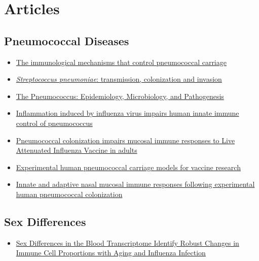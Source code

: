 \documentclass[
]{book}
\providecommand{\tightlist}{%
  \setlength{\itemsep}{0pt}\setlength{\parskip}{0pt}}
\begin{document}
\hypertarget{articles}{%
\section{Articles}\label{articles}}

\hypertarget{pneumococcal-diseases}{%
\subsection{Pneumococcal Diseases}\label{pneumococcal-diseases}}

\begin{itemize}
\item
  \href{https://journals.plos.org/plospathogens/article?id=10.1371/journal.ppat.1006665}{The immunological mechanisms that control pneumococcal carriage}
\item
  \href{https://pubmed.ncbi.nlm.nih.gov/29599457/}{\emph{Streptococcus pneumoniae}: transmission, colonization and invasion}
\item
  \href{https://pubmed.ncbi.nlm.nih.gov/23818515/}{The Pneumococcus: Epidemiology, Microbiology, and Pathogenesis}
\item
  \href{https://pubmed.ncbi.nlm.nih.gov/30374129/}{Inflammation induced by influenza virus impairs human innate immune control of pneumococcus}
\item
  \href{https://www.researchgate.net/publication/348794084_Pneumococcal_colonization_impairs_mucosal_immune_responses_to_Live_Attenuated_Influenza_Vaccine_in_adults}{Pneumococcal colonization impairs mucosal immune responses to Live Attenuated Influenza Vaccine in adults}
\item
  \href{}{Experimental human pneumococcal carriage models for vaccine research}
\item
  \href{}{Innate and adaptive nasal mucosal immune responses following experimental human pneumococcal colonization}
\end{itemize}

\hypertarget{sex-differences}{%
\subsection{Sex Differences}\label{sex-differences}}

\begin{itemize}
\tightlist
\item
  \href{https://www.sciencedirect.com/science/article/pii/S2211124719313191}{Sex Differences in the Blood Transcriptome Identify Robust Changes in Immune Cell Proportions with Aging and Influenza Infection}
\end{itemize}
\end{document}
